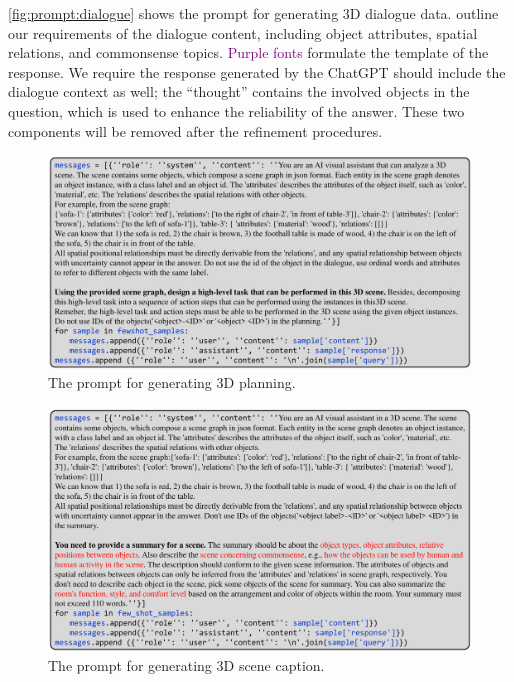 \cref{fig:prompt:dialogue} shows the prompt for generating 3D dialogue data. {\color{red}{Red fonts}} outline our requirements of the dialogue content, including object attributes, spatial relations, and commonsense topics. \textcolor{purple}{Purple fonts} formulate the template of the response. We require the response generated by the ChatGPT should include the dialogue context as well; the ``thought'' contains the involved objects in the question, which is used to enhance the reliability of the answer. These two components will be removed after the refinement procedures.

\begin{figure}[t!]
\centering
\includegraphics[width=\textwidth, keepaspectratio]{figs/prompt_planning.pdf}%
  \caption{The prompt for generating 3D planning.}
  \label{fig:prompt:planning}
\end{figure}

\begin{figure}[t!]
\centering
\includegraphics[width=\textwidth, keepaspectratio]{figs/prompt_scene_caption.pdf}%
  \caption{The prompt for generating 3D scene caption.}
  \label{fig:prompt:scene_caption}
\end{figure}

